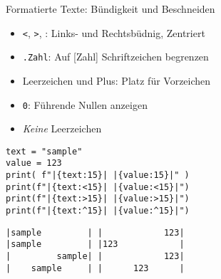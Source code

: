 \begin{frame}[fragile]{Formatierte Texte: Bündigkeit und Beschneiden}
%
\begin{itemize}
\item \texttt{<}, \texttt{>}, \inPy{^}: Links- und Rechtsbüdnig, Zentriert
\item \texttt{.Zahl}: Auf [Zahl] Schriftzeichen begrenzen
\item Leerzeichen und Plus: Platz für Vorzeichen
\item \texttt{0}: Führende Nullen anzeigen
\item \emph{Keine} Leerzeichen
\end{itemize}
%
\vspace{-10pt}
\begin{minipage}[t]{.49\linewidth}
\phantom{x}
\begin{codebox}
\begin{verbatim}
text = "sample"
value = 123
print( f"|{text:15}| |{value:15}|" )
print(f"|{text:<15}| |{value:<15}|")
print(f"|{text:>15}| |{value:>15}|")
print(f"|{text:^15}| |{value:^15}|")
\end{verbatim}
\end{codebox}
\end{minipage}
%
\begin{minipage}[t]{.49\linewidth}
\phantom{x}
\begin{cmdbox}
\begin{verbatim}
|sample         | |            123|
|sample         | |123            |
|         sample| |            123|
|    sample     | |      123      |
\end{verbatim}
\end{cmdbox}
\end{minipage}
%
\end{frame}


